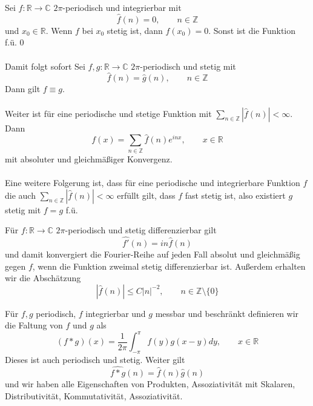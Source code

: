 \documentclass[11pt]{article}
\newenvironment{problem}[1]{
    \begin{trivlist}
        \item[\hskip \labelsep {\bfseries #1}] }{
    \end{trivlist}\normalshape
}
\newcommand{\Z}{\mathbb{Z}}
\newcommand{\R}{\mathbb{R}}
\newcommand{\C}{\mathbb{C}}
\begin{document}
    \begin{problem}{Eindeutigkeit}
        Sei $f:\R\to\C$ $2\pi$-periodisch und integrierbar mit
        $$\hat{f}(n)=0,\qquad n\in\Z$$
        und $x_0\in \R$. Wenn $f$ bei $x_0$ stetig ist, dann $f(x_0)=0$. Sonst ist die Funktion f.ü. $0$\\\\
        Damit folgt sofort
        Sei $f,g:\R\to\C$ $2\pi$-periodisch und stetig mit
        $$\hat{f}(n)=\hat{g}(n),\qquad n\in\Z$$
        Dann gilt $f\equiv g$.\\\\
        Weiter ist für eine periodische und stetige Funktion mit
        $\sum_{n\in\Z}|\hat{f}(n)|<\infty$. Dann
        $$f(x)=\sum_{n\in\Z}\hat{f}(n)e^{inx},\qquad x\in\R$$
        mit absoluter und gleichmäßiger Konvergenz.\\\\
        Eine weitere Folgerung ist, dass für eine periodische und integrierbare Funktion $f$ die auch
        $\sum_{n\in\Z}|\hat{f}(n)|<\infty$ erfüllt gilt, dass $f$ fast stetig ist, also existiert $g$ stetig
        mit $f=g$ f.ü.
    \end{problem}

    \begin{problem}{Absolute Konvergenz der Fourierkoeffizienten}
        Für $f:\R\to\C$ $2\pi$-periodisch und stetig differenzierbar gilt
        $$\hat{f'}(n)=in\hat{f}(n)$$
        und damit konvergiert die Fourier-Reihe auf jeden Fall absolut und gleichmäßig gegen $f$, wenn
        die Funktion zweimal stetig differenzierbar ist. Außerdem erhalten wir die Abschätzung
        $$|\hat{f}(n)|\leq C|n|^{-2},\qquad n\in\Z\setminus\{0\}$$
    \end{problem}

    \begin{problem}{Faltungsprodukt}
        Für $f,g$ periodisch, $f$ integrierbar und $g$ messbar und beschränkt definieren wir
        die Faltung von $f$ und $g$ als
        $$(f*g)(x)=\frac{1}{2\pi}\int_{-\pi}^{\pi} f(y)g(x-y)dy,\qquad x\in\R$$
        Dieses ist auch periodisch und stetig. Weiter gilt
        $$\hat{f*g}(n)=\hat{f}(n)\hat{g}(n)$$
        und wir haben alle Eigenschaften von Produkten, Assoziativität mit Skalaren, Distributivität,
        Kommutativität, Assoziativität.
    \end{problem}
\end{document}

